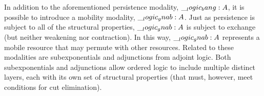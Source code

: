 
In addition to the aforementioned persistence modality, $\__logic_bang: A$, it is possible to introduce a mobility modality, $\__logic_gnab: A$.\autocite{Polakow+Pfenning:MFPS99}
Just as persistence is subject to all of the structural properties, $\__logic_gnab: A$ is subject to exchange (but neither weakening nor contraction).
In this way, $\__logic_gnab: A$ represents a mobile resource that may permute with other resources.
Related to these modalities are subexponentials\autocite{Kanovich+:MSCS19} and adjunctions from adjoint logic\autocite{??}.
Both subexponentials and adjunctions allow ordered logic to include multiple distinct layers, each with its own set of structural properties (that must, however, meet conditions for cut elimination).











